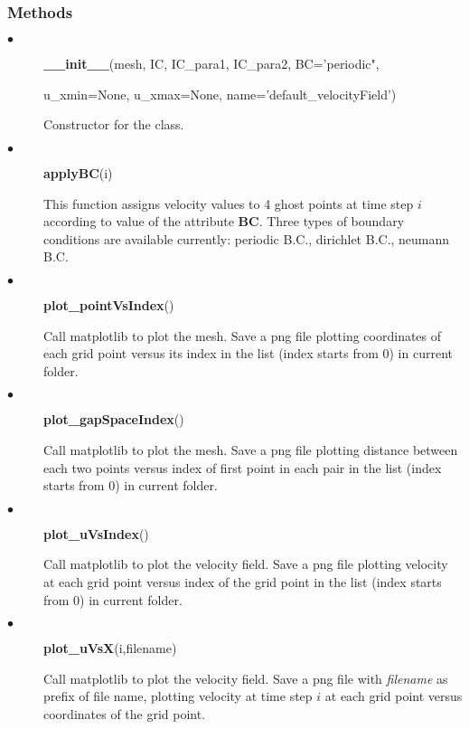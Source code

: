 \documentclass[11pt]{article}
\begin{document}
        \subsubsection{Methods}
        \begin{description}
            \item[$\bullet$]\textbf{\_\_init\_\_}(mesh, IC, IC\_para1, IC\_para2, BC='periodic",
                \par
                u\_xmin=None, u\_xmax=None, name='default\_velocityField')
                \par
                Constructor for the class. 
            \item[$\bullet$] \textbf{applyBC}(i)
                \par
                This function assigns velocity values to 4 ghost points at time step $i$ according to value of the attribute \textbf{BC}. 
                Three types of boundary conditions are available currently: periodic B.C., dirichlet B.C., neumann B.C.
            \item[$\bullet$] \textbf{plot\_pointVsIndex}()
                \par
                Call matplotlib to plot the mesh. Save a png file plotting coordinates of each grid point versus its index in the list (index starts from 0) in current folder.
            \item[$\bullet$] \textbf{plot\_gapSpaceIndex}()
                \par
                Call matplotlib to plot the mesh. Save a png file plotting distance between each two points versus index of first point in each pair in the list (index starts from 0) in current folder.
            \item[$\bullet$] \textbf{plot\_uVsIndex}()
                \par
                Call matplotlib to plot the velocity field. Save a png file plotting velocity at each grid point versus index of the grid point in the list (index starts from 0) in current folder.
            \item[$\bullet$] \textbf{plot\_uVsX}(i,filename)
                \par
                Call matplotlib to plot the velocity field. 
                Save a png file with \textit{filename} as prefix of file name, plotting velocity at time step $i$ at each grid point versus coordinates of the grid point. 

        \end{description}
\end{document}

